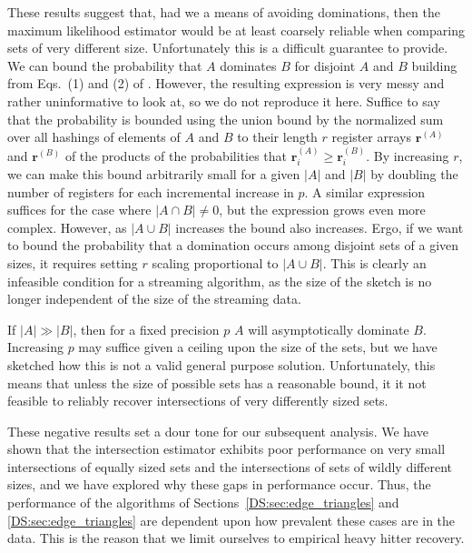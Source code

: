 \documentclass[10]{article}
\begin{document}
These results suggest that, had we a means of avoiding dominations, then the maximum likelihood estimator would be at least coarsely reliable when comparing sets of very different size. 
Unfortunately this is a difficult guarantee to provide.
We can bound the probability that $A$ dominates $B$ for disjoint $A$ and $B$ building from Eqs.~(1) and (2) of \cite{ertl2017new}.
However, the resulting expression is very messy and rather uninformative to look at, so we do not reproduce it here.
Suffice to say that the probability is bounded using the union bound by the normalized sum over all hashings of elements of $A$ and $B$ to their length $r$ register arrays $\mathbf{r}^{(A)}$ and $\mathbf{r}^{(B)}$ of the products of the probabilities that $\mathbf{r}^{(A)}_i \geq \mathbf{r}^{(B)}_i$.
By increasing $r$, we can make this bound arbitrarily small for a given $|A|$ and $|B|$ by doubling the number of registers for each incremental increase in $p$.
A similar expression suffices for the case where $|A \cap B| \neq 0$, but the expression grows even more complex.
However, as $|A \cup B|$ increases the bound also increases.
Ergo, if we want to bound the probability that a domination occurs among disjoint sets of a given sizes, it requires setting $r$ scaling proportional to $|A \cup B|$.
This is clearly an infeasible condition for a streaming algorithm, as the size of the sketch is no longer independent of the size of the streaming data.

If $|A| \gg |B|$, then for a fixed precision $p$ $A$ will asymptotically dominate $B$.
Increasing $p$ may suffice given a ceiling upon the size of the sets, but we have sketched how this is not a valid general purpose solution. 
Unfortunately, this means that unless the size of possible sets has a reasonable bound, it it not feasible to reliably recover intersections of very differently sized sets.

These negative results set a dour tone for our subsequent analysis. 
We have shown that the intersection estimator exhibits poor performance on very small intersections of equally sized sets and the intersections of sets of wildly different sizes, and we have explored why these gaps in performance occur.
Thus, the performance of the algorithms of Sections~\ref{DS:sec:edge_triangles} and \ref{DS:sec:edge_triangles} are dependent upon how prevalent these cases are in the data.
This is the reason that we limit ourselves to empirical heavy hitter recovery.

\end{document}
